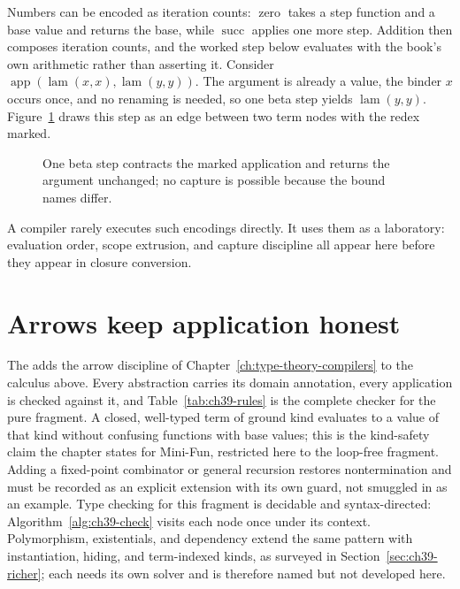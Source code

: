 Numbers can be encoded as iteration counts: $\operatorname{zero}$ takes a step function and a base value and returns the base, while $\operatorname{succ}$ applies one more step.
Addition then composes iteration counts, and the worked step below evaluates with the book's own arithmetic rather than asserting it.
Consider $\operatorname{app}(\operatorname{lam}(x, x), \operatorname{lam}(y, y))$.
The argument is already a value, the binder $x$ occurs once, and no renaming is needed, so one beta step yields $\operatorname{lam}(y, y)$.
Figure~\ref{fig:app-d-beta} draws this step as an edge between two term nodes with the redex marked.
\begin{figure}
\centering
{}
\caption{One beta step contracts the marked application and returns the argument unchanged; no capture is possible because the bound names differ.}
\label{fig:app-d-beta}
\end{figure}
A compiler rarely executes such encodings directly.
It uses them as a laboratory: evaluation order, scope extrusion, and capture discipline all appear here before they appear in closure conversion.

\section{Arrows keep application honest}
\label{sec:app-d-arrows}

The  adds the arrow discipline of Chapter~\ref{ch:type-theory-compilers} to the calculus above.
Every abstraction carries its domain annotation, every application is checked against it, and Table~\ref{tab:ch39-rules} is the complete checker for the pure fragment.
A closed, well-typed term of ground kind evaluates to a value of that kind without confusing functions with base values; this is the kind-safety claim the chapter states for Mini-Fun, restricted here to the loop-free fragment.
Adding a fixed-point combinator or general recursion restores nontermination and must be recorded as an explicit extension with its own guard, not smuggled in as an example.
Type checking for this fragment is decidable and syntax-directed: Algorithm~\ref{alg:ch39-check} visits each node once under its context.
Polymorphism, existentials, and dependency extend the same pattern with instantiation, hiding, and term-indexed kinds, as surveyed in Section~\ref{sec:ch39-richer}; each needs its own solver and is therefore named but not developed here.

